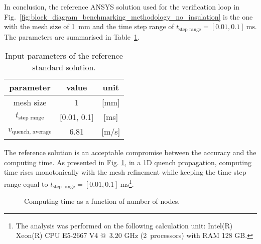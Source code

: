 In conclusion, the reference ANSYS solution used for the verification loop in Fig.~\ref{fig:block_diagram_benchmarking_methodology_no_insulation} is the one with the mesh size of 1~mm and the time step range of $t_\text{step range}=[0.01, 0.1]~\text{ms}$. The parameters are summarised in Table~\ref{table: 1d_qv_benchmarking_reference_analysis_settings_no_insulation}. 

\begin{table}[H]
    \caption{Input parameters of the reference standard solution.} 
    \vspace{-1.em} 
    \fontsize{10}{10}
    \selectfont 
    \renewcommand{\arraystretch}{1.5}
    \begin{center}
        \begin{tabular}{ ccc }  
        \hline
        parameter & value & unit \\
        \hline
        mesh size & 1 & [mm] \\
        $t_\text{step range}$ & [0.01, 0.1] & [ms] \\
        $v_\text{quench, average}$ & 6.81 & [m/s] \\
        \hline 
        \end{tabular}
    \end{center}  
     \label{table: 1d_qv_benchmarking_reference_analysis_settings_no_insulation} 
 \end{table}

The reference solution is an acceptable compromise between the accuracy and the computing time. As presented in Fig. \ref{fig: q_vel_modelling_heat_balance_computing_time_no_insulation}, in a 1D quench propagation, computing time rises monotonically with the mesh refinement while keeping the time step range equal to $t_\text{step range}=[0.01, 0.1]~\text{ms}$\footnote{The analysis was performed on the following calculation unit: Intel(R) Xeon(R) CPU E5-2667 V4 @~3.20 GHz (2~processors) with RAM 128 GB.}.

\begin{figure}[H]
\centering
    \caption{Computing time as a function of number of nodes.}
    \label{fig: q_vel_modelling_heat_balance_computing_time_no_insulation}
\end{figure}
